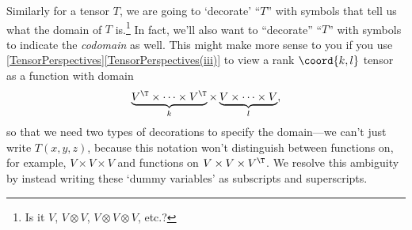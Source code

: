 Similarly for a tensor $T$, we are going to `decorate' ``$T$'' with symbols that tell us what the domain of $T$ is.\footnote{Is it $V$, $V\otimes V$, $V\otimes V\otimes V$, etc.?}  In fact, we'll also want to ``decorate'' ``$T$'' with symbols to indicate the \emph{codomain} as well.  This might make more sense to you if you use \cref{TensorPerspectives}\cref{TensorPerspectives(iii)} to view a rank $\coord{k,l}$ tensor as a function with domain
\begin{equation}
	\underbrace{V^{\T}\times \cdots \times V^{\T}}_k\times \underbrace{V\times \cdots \times V}_l,
\end{equation}
so that we need two types of decorations to specify the domain---we can't just write $T(x,y,z)$, because this notation won't distinguish between functions on, for example, $V\times V\times V$ and functions on $V\times V\times V^{\T}$.  We resolve this ambiguity by instead writing these `dummy variables' as subscripts and superscripts.
